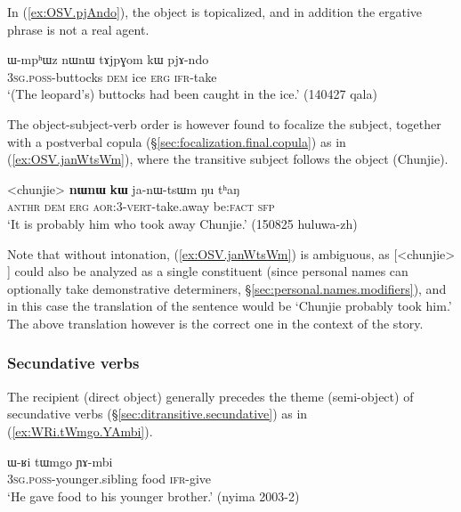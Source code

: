 In (\ref{ex:OSV.pjAndo}), the object  is topicalized, and in addition the ergative phrase  is not a real agent.

\begin{exe}
\ex \label{ex:OSV.pjAndo}
\gll  ɯ-mpʰɯz nɯnɯ tɤjpɣom kɯ pjɤ-ndo \\
\textsc{3sg}.\textsc{poss}-buttocks \textsc{dem} ice \textsc{erg} \textsc{ifr}-take \\
\glt `(The leopard's) buttocks had been caught in the ice.' (140427 qala)
\end{exe}
 
The object-subject-verb order is however found to focalize the subject, together with a postverbal copula (§\ref{sec:focalization.final.copula}) as in  (\ref{ex:OSV.janWtsWm}), where the transitive subject  follows the object (Chunjie). 

 
\begin{exe}
\ex \label{ex:OSV.janWtsWm}
\gll <chunjie> \textbf{nɯnɯ} \textbf{kɯ} ja-nɯ-tsɯm ŋu tʰaŋ \\
\textsc{anthr} \textsc{dem} \textsc{erg} \textsc{aor}:3\flobv{}-\textsc{vert}-take.away be:\textsc{fact} \textsc{sfp} \\
\glt `It is probably him who took away Chunjie.' (150825 huluwa-zh)
\end{exe}

Note that without intonation, (\ref{ex:OSV.janWtsWm}) is ambiguous, as [<chunjie> ] could also be analyzed as a single constituent (since personal names can optionally take demonstrative determiners, §\ref{sec:personal.names.modifiers}), and in this case the translation of the sentence would be `Chunjie probably took him.' The above translation however is the correct one in the context of the story.


\subsubsection{Secundative verbs} \label{sec:secundative.word.order}
 
The recipient (direct object) generally precedes the theme (semi-object) of secundative verbs (§\ref{sec:ditransitive.secundative}) as in (\ref{ex:WRi.tWmgo.YAmbi}).

\begin{exe}
\ex \label{ex:WRi.tWmgo.YAmbi}
\gll ɯ-ʁi tɯmgo ɲɤ-mbi \\
\textsc{3sg}.\textsc{poss}-younger.sibling food \textsc{ifr}-give \\
\glt `He gave food to his younger brother.' (nyima 2003-2)
\end{exe}

